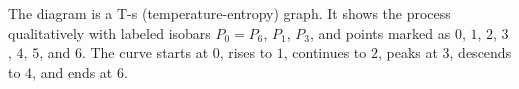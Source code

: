 The diagram is a T-s (temperature-entropy) graph. It shows the process qualitatively with labeled isobars \( P_0 = P_6 \), \( P_1 \), \( P_3 \), and points marked as \( 0 \), \( 1 \), \( 2 \), \( 3 \), \( 4 \), \( 5 \), and \( 6 \). The curve starts at \( 0 \), rises to \( 1 \), continues to \( 2 \), peaks at \( 3 \), descends to \( 4 \), and ends at \( 6 \).